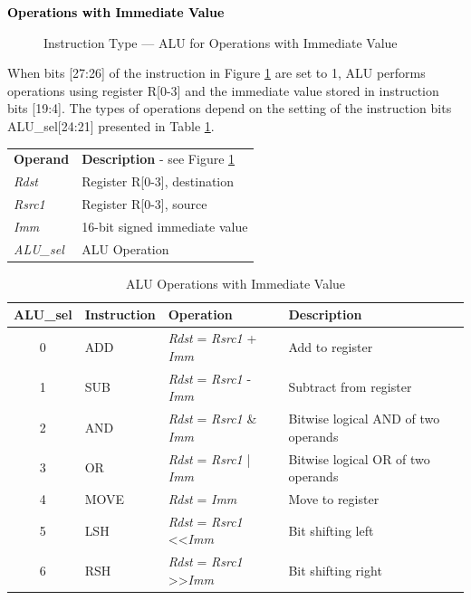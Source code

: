 \documentclass[main\_\_EN.tex]{subfiles}
\begin{document}
\textcolor{black}{\bfseries  Operations with Immediate Value }

%
%
%
%
%
%
%
%
\begin{figure}[!ht ]
    \centering
    \caption{Instruction Type — ALU for Operations with Immediate Value}
    \label{figure:ALU-with-immediate-value}
\end{figure}

When bits [27:26] of the instruction in Figure \ref{figure:ALU-with-immediate-value} are set to 1, ALU performs operations using register R[0-3] and the immediate value stored in instruction bits [19:4]. The types of operations depend on the setting of the instruction bits ALU\_sel[24:21] presented in Table \ref{table:ALU-with-immediate-value}.

\begin{tabular}{ l l }
\textbf{Operand} & \textbf{Description} - see Figure \ref{figure:ALU-with-immediate-value} \\
\textit{Rdst} & Register R[0-3], destination \\
\textit{Rsrc1} & Register R[0-3], source \\
\textit{Imm} & 16-bit signed immediate value\\
\textit{ALU\_sel} & ALU Operation
\end{tabular}

\begin{table}[!ht ]
    \centering
    \begin{tabular}{ c l l l }
    \textbf{ALU\_sel} & \textbf{Instruction} & \textbf{Operation} & \textbf{Description} \\ \hline
    0 & ADD & \textit{Rdst} = \textit{Rsrc1} + \textit{Imm} & Add to register \\
    1 & SUB & \textit{Rdst} = \textit{Rsrc1} - \textit{Imm} & Subtract from register \\
    2 & AND & \textit{Rdst} = \textit{Rsrc1} \& \textit{Imm} & Bitwise logical AND of two operands \\
    3 & OR & \textit{Rdst} = \textit{Rsrc1} | \textit{Imm} & Bitwise logical OR of two operands \\
    4 & MOVE & \textit{Rdst} = \textit{Imm} & Move to register \\
    5 & LSH & \textit{Rdst} = \textit{Rsrc1} \textless\textless\textvisiblespace \textit{Imm} & Bit shifting left \\
    6 & RSH & \textit{Rdst} = \textit{Rsrc1} \textgreater\textgreater\textvisiblespace \textit{Imm} & Bit shifting right \\
    \end{tabular}
    \caption{ALU Operations with Immediate Value}
    \label{table:ALU-with-immediate-value}
\end{table}
\end{document}
